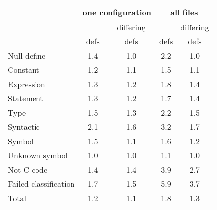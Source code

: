 \begin{tabular}{|l|c|c|c|c|} \hline
 & \multicolumn{2}{c|}{one configuration}
 & \multicolumn{2}{c|}{all files} \\ \hline
 & & \multicolumn{1}{c|}{differing} & & \multicolumn{1}{c|}{differing} \\
 & \multicolumn{1}{c|}{defs} & \multicolumn{1}{c|}{defs}
 & \multicolumn{1}{c|}{defs} & \multicolumn{1}{c|}{defs} \\ \hline
Null define &            1.4 & 1.0 & 2.2 & 1.0 \\
Constant &               1.2 & 1.1 & 1.5 & 1.1 \\
Expression &             1.3 & 1.2 & 1.8 & 1.4 \\
Statement &              1.3 & 1.2 & 1.7 & 1.4 \\
Type &                   1.5 & 1.3 & 2.2 & 1.5 \\
Syntactic &              2.1 & 1.6 & 3.2 & 1.7 \\
Symbol &                 1.5 & 1.1 & 1.6 & 1.2 \\
Unknown symbol &         1.0 & 1.0 & 1.1 & 1.0 \\
Not C code &             1.4 & 1.4 & 3.9 & 2.7 \\
Failed classification &  1.7 & 1.5 & 5.9 & 3.7 \\ \hline
Total &                  1.2 & 1.1 & 1.8 & 1.3 \\ \hline
\end{tabular}


